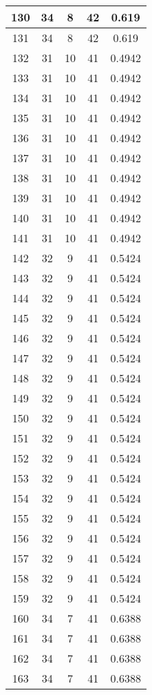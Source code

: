 \documentclass[letterpaper, 12pt]{article}
\begin{document}
\begin{longtable}{|c|c|c|c|c|}
\hline
130 & 34 & 8 & 42 & 0.619 \\
\hline
131 & 34 & 8 & 42 & 0.619 \\
\hline
132 & 31 & 10 & 41 & 0.4942 \\
\hline
133 & 31 & 10 & 41 & 0.4942 \\
\hline
134 & 31 & 10 & 41 & 0.4942 \\
\hline
135 & 31 & 10 & 41 & 0.4942 \\
\hline
136 & 31 & 10 & 41 & 0.4942 \\
\hline
137 & 31 & 10 & 41 & 0.4942 \\
\hline
138 & 31 & 10 & 41 & 0.4942 \\
\hline
139 & 31 & 10 & 41 & 0.4942 \\
\hline
140 & 31 & 10 & 41 & 0.4942 \\
\hline
141 & 31 & 10 & 41 & 0.4942 \\
\hline
142 & 32 & 9 & 41 & 0.5424 \\
\hline
143 & 32 & 9 & 41 & 0.5424 \\
\hline
144 & 32 & 9 & 41 & 0.5424 \\
\hline
145 & 32 & 9 & 41 & 0.5424 \\
\hline
146 & 32 & 9 & 41 & 0.5424 \\
\hline
147 & 32 & 9 & 41 & 0.5424 \\
\hline
148 & 32 & 9 & 41 & 0.5424 \\
\hline
149 & 32 & 9 & 41 & 0.5424 \\
\hline
150 & 32 & 9 & 41 & 0.5424 \\
\hline
151 & 32 & 9 & 41 & 0.5424 \\
\hline
152 & 32 & 9 & 41 & 0.5424 \\
\hline
153 & 32 & 9 & 41 & 0.5424 \\
\hline
154 & 32 & 9 & 41 & 0.5424 \\
\hline
155 & 32 & 9 & 41 & 0.5424 \\
\hline
156 & 32 & 9 & 41 & 0.5424 \\
\hline
157 & 32 & 9 & 41 & 0.5424 \\
\hline
158 & 32 & 9 & 41 & 0.5424 \\
\hline
159 & 32 & 9 & 41 & 0.5424 \\
\hline
160 & 34 & 7 & 41 & 0.6388 \\
\hline
161 & 34 & 7 & 41 & 0.6388 \\
\hline
162 & 34 & 7 & 41 & 0.6388 \\
\hline
163 & 34 & 7 & 41 & 0.6388 \\

\end{longtable}
\end{document}
